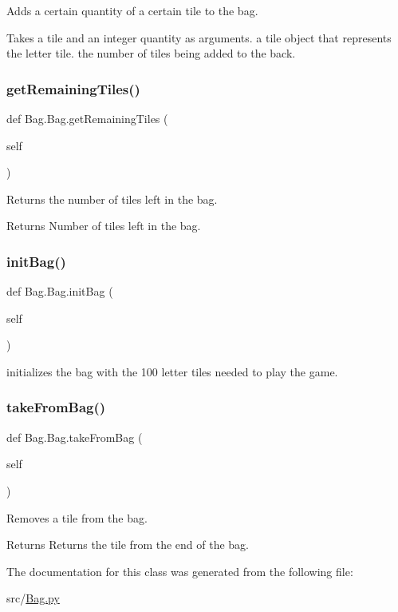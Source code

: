 Adds a certain quantity of a certain tile to the bag. 

Takes a tile and an integer quantity as arguments.  a tile object that represents the letter tile.  the number of tiles being added to the back. \mbox{\label{class_bag_1_1_bag_acfe00e02e1c1f551f6e6855de45afb6d}} 
\subsubsection{\texorpdfstring{get\+Remaining\+Tiles()}{getRemainingTiles()}}
{\footnotesize\ttfamily def Bag.\+Bag.\+get\+Remaining\+Tiles (\begin{DoxyParamCaption}\item[{}]{self }\end{DoxyParamCaption})}



Returns the number of tiles left in the bag. 

\begin{DoxyReturn}{Returns}
Number of tiles left in the bag. 
\end{DoxyReturn}
\mbox{\label{class_bag_1_1_bag_ad9b292e02f119061e2a2e7f31eadf074}} 
\subsubsection{\texorpdfstring{init\+Bag()}{initBag()}}
{\footnotesize\ttfamily def Bag.\+Bag.\+init\+Bag (\begin{DoxyParamCaption}\item[{}]{self }\end{DoxyParamCaption})}



initializes the bag with the 100 letter tiles needed to play the game. 

\mbox{\label{class_bag_1_1_bag_ae042107d5d97af68350a987ce34b2cf1}} 
\subsubsection{\texorpdfstring{take\+From\+Bag()}{takeFromBag()}}
{\footnotesize\ttfamily def Bag.\+Bag.\+take\+From\+Bag (\begin{DoxyParamCaption}\item[{}]{self }\end{DoxyParamCaption})}



Removes a tile from the bag. 

\begin{DoxyReturn}{Returns}
Returns the tile from the end of the bag. 
\end{DoxyReturn}


The documentation for this class was generated from the following file\+:\begin{DoxyCompactItemize}
\item 
src/\hyperlink{_bag_8py}{Bag.\+py}\end{DoxyCompactItemize}
